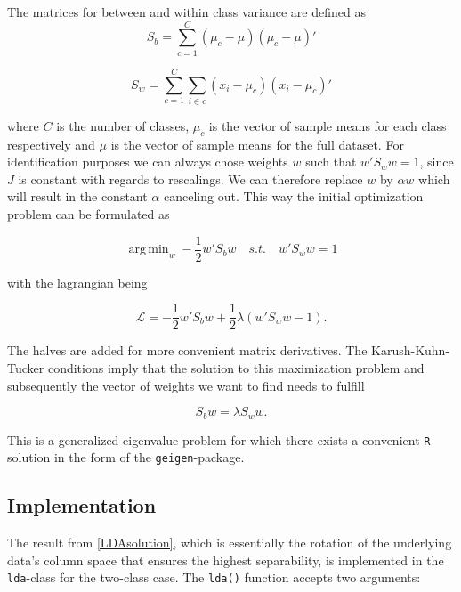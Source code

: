 \documentclass{article}
\DeclareMathOperator*{\argmin}{arg\,min}
\begin{document}
The matrices for between and within class variance are defined as
\begin{equation}
S_b = \sum_{c=1}^{C}(\mu_c - \mu)(\mu_c - \mu)\prime
\end{equation}

\begin{equation}
\label{Sw}
S_w = \sum_{c=1}^{C}\sum_{i \in c}(x_i - \mu_c)(x_i - \mu_c)\prime
\end{equation} 

where $C$ is the number of classes, $\mu_c$ is the vector of sample means for each class respectively and $\mu$ is the vector of sample means for the full dataset. For identification purposes we can always chose weights $w$ such that $w\prime S_w w = 1$, since $J$ is constant with regards to rescalings. We can therefore replace $w$ by $\alpha w$ which will result in the constant $\alpha$ canceling out. This way the initial optimization problem can be formulated as

\begin{equation}
\argmin_{w} -\frac{1}{2} w\prime S_b w \quad s.t. \quad w \prime S_w w = 1
\end{equation}

with the lagrangian being

\begin{equation}
\mathcal{L} = -\frac{1}{2} w\prime S_b w + \frac{1}{2}\lambda\left(w\prime S_w w - 1\right).
\end{equation}

The halves are added for more convenient matrix derivatives. The Karush-Kuhn-Tucker conditions imply that the solution to this maximization problem and subsequently the vector of weights we want to find needs to fulfill

\begin{equation}
\label{LDAsolution}
S_b w = \lambda S_w w.
\end{equation}

This is a generalized eigenvalue problem for which there exists a convenient \texttt{R}-solution in the form of the \texttt{geigen}-package.

\subsection{Implementation}

The result from \ref{LDAsolution}, which is essentially the rotation of the underlying data's column space that ensures the highest separability, is implemented in the \texttt{lda}-class for the two-class case. The \texttt{lda()} function accepts two arguments:
\end{document}

